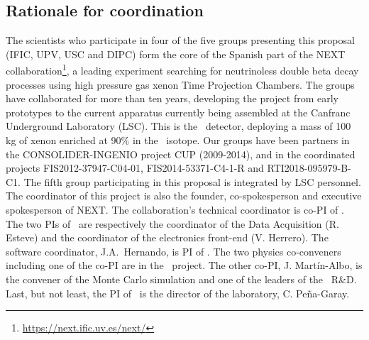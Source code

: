\subsection{Rationale for coordination}
 The scientists who participate in four of the five groups presenting this proposal (IFIC, UPV, USC and DIPC) form the core of the Spanish part of the NEXT collaboration\footnote{\url{https://next.ific.uv.es/next/}}, a leading experiment searching for neutrinoless double beta decay processes using high pressure gas xenon Time Projection Chambers. The groups have collaborated for more than ten years, developing the project from early prototypes to the current apparatus currently being assembled at the Canfranc Underground Laboratory (LSC). This is the \Next\ detector, deploying a mass of 100 kg of xenon enriched at 90\% in the \XE\ isotope. Our groups have been partners in the CONSOLIDER-INGENIO project CUP (2009-2014), and in the coordinated projects FIS2012-37947-C04-01, FIS2014-53371-C4-1-R and RTI2018-095979-B-C1. The fifth group participating in this proposal is integrated by LSC personnel. The coordinator of this project is also the founder, co-spokesperson and executive spokesperson of NEXT.  The collaboration's technical coordinator is co-PI of \sDIPC. The two PIs of \sUPV\ are respectively the coordinator of the Data Acquisition (R. Esteve)  and the coordinator of the electronics front-end (V. Herrero). The software coordinator, J.A.~Hernando, is PI of \sUSC.  The two physics co-conveners including one of the co-PI are in the \sIFIC\ project. The other co-PI, J. Martín-Albo, is the convener of the Monte Carlo simulation and one of the leaders of the \NHD\ R\&D. Last, but not least, the PI of \sLSC\ is the director of the laboratory, C. Pe\~na-Garay.  

  
% 
 
